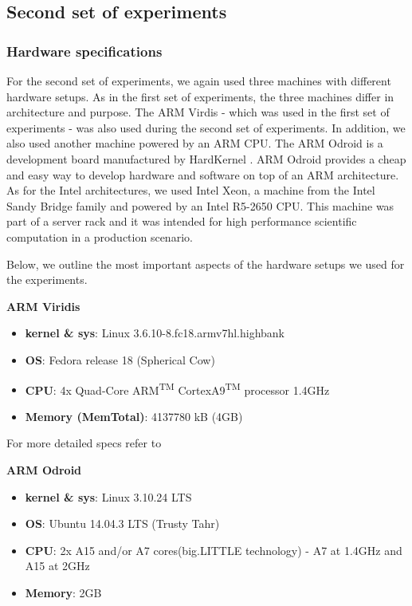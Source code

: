 \subsection{Second set of experiments}

\subsubsection*{Hardware specifications}

For the second set of experiments, we again used three machines with different hardware setups. As in the first set of experiments, the three machines differ in architecture and purpose. The ARM Virdis - which was used in the first set of experiments - was also used during the second set of experiments. In addition, we also used another machine powered by an ARM CPU. The ARM Odroid is a development board manufactured by HardKernel \cite{ODROID_XU3}. ARM Odroid provides a cheap and easy way to develop hardware and software on top of an ARM architecture. As for the Intel architectures, we used Intel Xeon, a machine from the Intel Sandy Bridge family and powered by an Intel R5-2650 CPU. This machine was part of a server rack and it was intended for high performance scientific computation in a production scenario.

Below, we outline the most important aspects of the hardware setups we used for the experiments.

\vspace{10mm}
\textbf{ARM Viridis}
\begin{itemize}
  \item[] \textbf{kernel \& sys}:  Linux  3.6.10-8.fc18.armv7hl.highbank
  \item[] \textbf{OS}: Fedora release 18 (Spherical Cow)
  \item[] \textbf{CPU}:    4x Quad-Core ARM\textsuperscript{TM} CortexA9\textsuperscript{TM} processor \@1.4GHz
  \item[] \textbf{Memory  (MemTotal)}:        4137780 kB (4GB) 
\end{itemize}

For more detailed specs refer to \cite{viridis_specs}


\vspace{10mm}
\textbf{ARM Odroid}
\begin{itemize}
  \item[] \textbf{kernel \& sys}:  Linux 3.10.24 LTS
  \item[] \textbf{OS}: Ubuntu 14.04.3 LTS (Trusty Tahr)
  \item[] \textbf{CPU}: 2x A15 and/or A7 cores(big.LITTLE technology) - A7 at 1.4GHz and A15 at 2GHz
  \item[] \textbf{Memory}:        2GB
\end{itemize}

